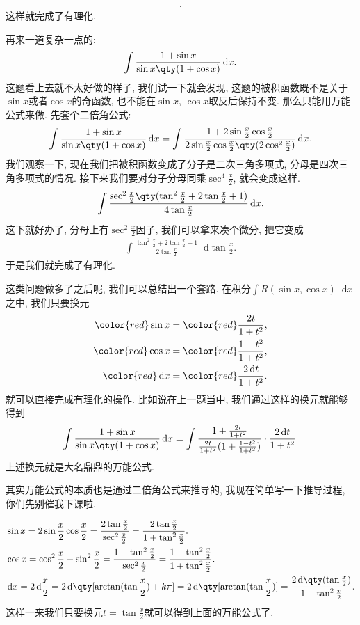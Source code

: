 \documentclass{ctexbook}
\newcommand*{\dif}{\mathop{}\!\mathrm{d}}
\begin{document}
{\begin{align*}
.\end{align*}
这样就完成了有理化. \par
再来一道复杂一点的: 
\begin{align*}
\int\frac{1+\sin{x}}{\sin{x}\qty(1+\cos{x})}\dif{x}
.\end{align*}
这题看上去就不太好做的样子, 我们试一下就会发现, 这题的被积函数既不是关于$\sin{x}$或者$\cos{x}$的奇函数, 也不能在$\sin{x},\,\cos{x}$取反后保持不变. 那么只能用万能公式来做. 先套个二倍角公式: 
\begin{align*}
\int\frac{1+\sin{x}}{\sin{x}\qty(1+\cos{x})}\dif{x}=\int\frac{1+2\sin{\frac{x}{2}}\cos{\frac{x}{2}}}{2\sin{\frac{x}{2}}\cos{\frac{x}{2}}\qty(2\cos^{2}{\frac{x}{2}})}\dif{x}
.\end{align*}
我们观察一下, 现在我们把被积函数变成了分子是二次三角多项式, 分母是四次三角多项式的情况. 接下来我们要对分子分母同乘$\sec^{4}{\frac{x}{2}}$, 就会变成这样. 
\begin{align*}
\int\frac{\sec^{2}{\frac{x}{2}}\qty(\tan^{2}{\frac{x}{2}}+2\tan{\frac{x}{2}}+1)}{4\tan{\frac{x}{2}}}\dif{x}
.\end{align*}
这下就好办了, 分母上有$\sec^{2}{\frac{x}{2}}$因子, 我们可以拿来凑个微分, 把它变成
\begin{align*}
\int\frac{\tan^{2}{\frac{x}{2}}+2\tan{\frac{x}{2}}+1}{2\tan{\frac{x}{2}}}\dif{\tan{\frac{x}{2}}}
.\end{align*}
于是我们就完成了有理化. \par
这类问题做多了之后呢, 我们可以总结出一个套路. 在积分$\int R(\sin{x},\cos{x})\dif{x}$之中, 我们只要换元
\begin{align*}\color{red}
\sin{x}={}&\color{red}\frac{2t}{1+t^{2}},\\\color{red}
\cos{x}={}&\color{red}\frac{1-t^{2}}{1+t^{2}},\\\color{red}
\dif{x}={}&\color{red}\frac{2\dif{t}}{1+t^{2}}
.\end{align*}
就可以直接完成有理化的操作. 比如说在上一题当中, 我们通过这样的换元就能够得到
\begin{align*}
\int\frac{1+\sin{x}}{\sin{x}\qty(1+\cos{x})}\dif{x}=\int\frac{1+\frac{2t}{1+t^{2}}}{\frac{2t}{1+t^{2}}(1+\frac{1-t^{2}}{1+t^{2}})}\cdot\frac{2\dif{t}}{1+t^{2}}
.\end{align*}
上述换元就是大名鼎鼎的万能公式. \par
其实万能公式的本质也是通过二倍角公式来推导的, 我现在简单写一下推导过程, 你们先别催我下课啦. \par
\begin{align*}
{}&\sin{x}=2\sin{\frac{x}{2}}\cos{\frac{x}{2}}=\frac{2\tan{\frac{x}{2}}}{\sec^{2}{\frac{x}{2}}}=\frac{2\tan{\frac{x}{2}}}{1+\tan^{2}{\frac{x}{2}}}.\\
{}&\cos{x}=\cos^{2}{\frac{x}{2}}-\sin^{2}{\frac{x}{2}}=\frac{1-\tan^{2}{\frac{x}{2}}}{\sec^{2}{\frac{x}{2}}}=\frac{1-\tan^{2}{\frac{x}{2}}}{1+\tan^{2}{\frac{x}{2}}}.\\
{}&\dif{x}=2\dif{\frac{x}{2}}=2\dif{\qty[\arctan(\tan{\frac{x}{2}})+k\pi]}=2\dif{\qty[\arctan(\tan{\frac{x}{2}})]}=\frac{2\dif{\qty(\tan{\frac{x}{2}})}}{1+\tan^{2}{\frac{x}{2}}}
.\end{align*}
这样一来我们只要换元$t=\tan{\frac{x}{2}}$就可以得到上面的万能公式了. \par
}
\end{document}
